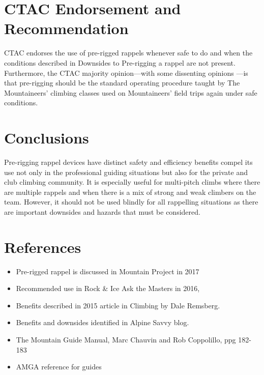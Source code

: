 \documentclass[nonacm,acmtog,authordraft]{acmart}
\begin{document}
\section{CTAC Endorsement and Recommendation}

  CTAC endorses the use of pre-rigged rappels whenever safe to do and when the
  conditions described in Downsides to Pre-rigging a rappel are not present.
  Furthermore, the CTAC majority opinion---with some dissenting opinions ---is
  that pre-rigging should be the standard operating procedure taught by The
  Mountaineers' climbing classes used on Mountaineers' field trips again under
  safe conditions.

\section{Conclusions}

  Pre-rigging rappel devices have distinct safety and efficiency benefits
  compel its use not only in the professional guiding situations but also for
  the private and club climbing community. It is especially useful for
  multi-pitch climbs where there are multiple rappels and when there is a mix
  of strong and weak climbers on the team.  However, it should not be used
  blindly for all rappelling situations as there are important downsides and
  hazards that must be considered.

\section{References}
   
   \begin{itemize}
   \item Pre-rigged rappel  is discussed in Mountain Project in 2017 
   \item Recommended use in Rock \& Ice Ask the Masters in 2016,
   \item Benefits described in 2015 article in Climbing by Dale Remsberg.
   \item Benefits and downsides identified in Alpine Savvy blog.
   \item The Mountain Guide Manual, Marc Chauvin and Rob Coppolillo, ppg
     182-183
   \item AMGA reference for guides
   \end{itemize}

%
%
\end{document}
